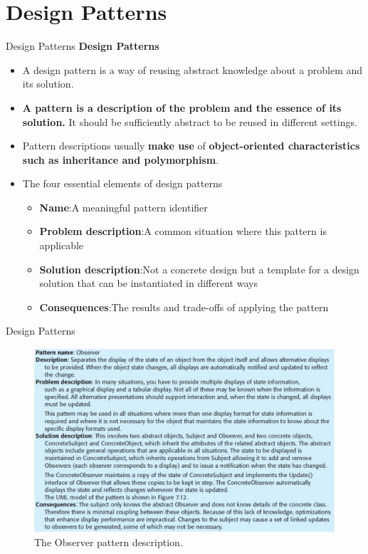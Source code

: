 \documentclass{beamer}
\begin{document}
\section{Design Patterns}
\begin{frame}{Design Patterns}
	\textbf{{Design Patterns}}
\begin{itemize}
	\item A design pattern is a way of reusing abstract knowledge about a problem and its solution. 
	\item 
	\textbf{A pattern is a description of the problem and the essence of its solution. }It should be 
	sufficiently abstract to be reused in different settings.
	\item Pattern descriptions usually\textbf{ make use} of \textbf{object-oriented characteristics such as 
		inheritance and polymorphism}.

\item The four essential elements of design patterns
\begin{itemize}
	\item \textbf{Name}:A meaningful pattern identifier
	\item \textbf{Problem description}:A common situation where this pattern is applicable
	\item \textbf{Solution description}:Not a concrete design but a template for a design solution that can be instantiated in different ways
	\item \textbf{Consequences}:The results and trade-offs of applying the pattern

	

\end{itemize}
\end{itemize}

\end{frame}
\begin{frame}{Design Patterns}
	\begin{figure}
	\includegraphics[scale=.5]{img/m3_11}
	\caption{The Observer pattern description.}
\end{figure}
	
\end{frame}
\end{document}
